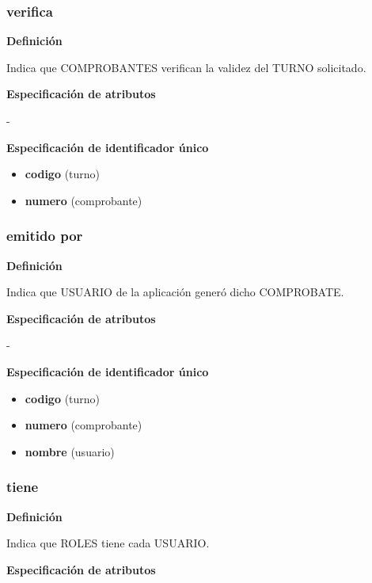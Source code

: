 \documentclass[a4paper,11pt]{article}
\begin{document}
\subsubsection{\textbf{verifica}}

\textbf{Definición}

Indica que COMPROBANTES verifican la validez del TURNO solicitado.

\textbf{Especificación de atributos}

-

\textbf{Especificación de identificador único}

\begin{itemize}

     \item \textbf{codigo} (turno)

     \item \textbf{numero} (comprobante)

\end{itemize}

\subsubsection{\textbf{emitido por}}

\textbf{Definición}

Indica que USUARIO de la aplicación generó dicho COMPROBATE.

\textbf{Especificación de atributos}

-

\textbf{Especificación de identificador único}

\begin{itemize}

     \item \textbf{codigo} (turno)

     \item \textbf{numero} (comprobante)

     \item \textbf{nombre} (usuario)

\end{itemize}

\subsubsection{\textbf{tiene}}

\textbf{Definición}

Indica que ROLES tiene cada USUARIO.

\textbf{Especificación de atributos}
\end{document}
